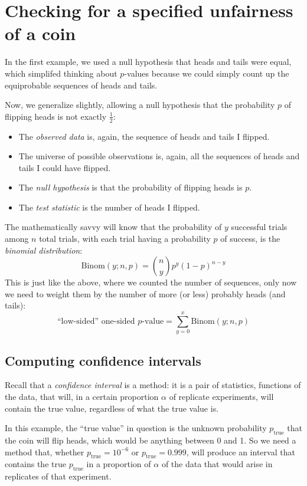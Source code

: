 \section{Checking for a specified unfairness of a coin}

In the first example, we used a null hypothesis that heads and tails were equal, which simplifed thinking about $p$-values because we could simply count up the equiprobable sequences of heads and tails.

Now, we generalize slightly, allowing a null hypothesis that the probability $p$ of flipping heads is not exactly $\tfrac{1}{2}$:
\begin{itemize}
\item The \emph{observed data} is, again, the sequence of heads and tails I flipped.
\item The universe of possible observations is, again, all the sequences of heads and tails I could have flipped.
\item The \emph{null hypothesis} is that the probability of flipping heads is $p$.
\item The \emph{test statistic} is the number of heads I flipped.
\end{itemize}

The mathematically savvy will know that the probability of $y$ successful trials among $n$ total trials, with each trial having a probability $p$ of success, is the \emph{binomial distribution}:
\begin{equation}
    \mathrm{Binom}(y; n, p) = \binom{n}{y} p^y (1-p)^{n-y}
\end{equation}
This is just like the above, where we counted the number of sequences, only now
we need to weight them by the number of more (or less) probably heads (and
tails):
\begin{equation}
    \text{``low-sided'' one-sided $p$-value} = \sum_{y=0}^x \mathrm{Binom}(y; n, p)
\end{equation}

\subsection{Computing confidence intervals}

Recall that a \emph{confidence interval} is a method: it is a pair of
statistics, functions of the data, that will, in a certain proportion $\alpha$
of replicate experiments, will contain the true value, regardless of what the
true value is.

In this example, the ``true value'' in question is the unknown probability
$p_\mathrm{true}$ that the coin will flip heads, which would be anything
between 0 and 1.  So we need a method that, whether $p_\mathrm{true} = 10^{-6}$
or $p_\mathrm{true} = 0.999$, will produce an interval that contains the true
$p_\mathrm{true}$ in a proportion of $\alpha$ of the data that would arise in
replicates of that experiment.

